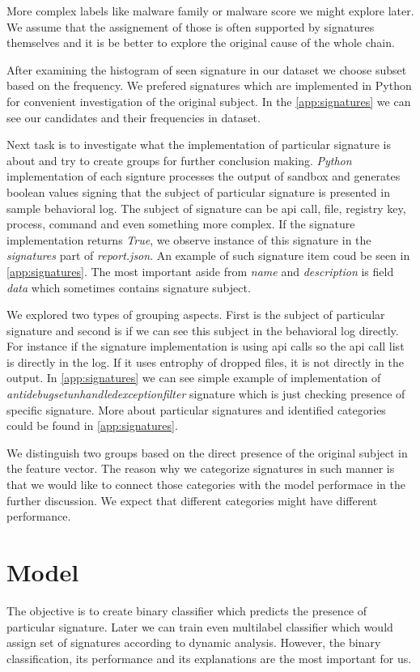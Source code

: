 More complex labels like malware family or malware score we might explore later. We assume that the assignement of those is often supported by signatures themselves and it is be better to explore the original cause of the whole chain.

After examining the histogram of seen signature in our dataset we choose subset based on the frequency. We prefered signatures which are implemented in Python for convenient investigation of the original subject. In the \ref{app:signatures} we can see our candidates and their frequencies in dataset.

Next task is to investigate what the implementation of particular signature is about and try to create groups for further conclusion making. \emph{Python} implementation of each signture processes the output of sandbox and generates boolean values signing that the subject of particular signature is presented in sample behavioral log. The subject of signature can be api call, file, registry key, process, command and even something more complex. If the signature implementation returns \emph{True}, we observe instance of this signature in the \emph{signatures} part of \emph{report.json}. An example of such signature item coud be seen in \ref{app:signatures}. The most important aside from \emph{name} and \emph{description} is field \emph{data} which sometimes contains signature subject.

We explored two types of grouping aspects. First is the subject of particular signature and second is if we can see this subject in the behavioral log directly. For instance if the signature implementation is using api calls so the api call list is directly in the log. If it uses entrophy of dropped files, it is not directly in the output. In \ref{app:signatures} we can see simple example of implementation of \emph{antidebugsetunhandledexceptionfilter} signature which is just checking presence of specific signature.
More about particular signatures and identified categories could be found in \ref{app:signatures}. 

We distinguish two groups based on the direct presence of the original subject in the feature vector. The reason why we categorize signatures in such manner is that we would like to connect those categories with the model performace in the further discussion. We expect that different categories might have different performance.

\section{Model}
The objective is to create binary classifier which predicts the presence of particular signature. Later we can train even multilabel classifier which would assign set of signatures according to dynamic analysis. However, the binary classification, its performance and its explanations are the most important for us. 

